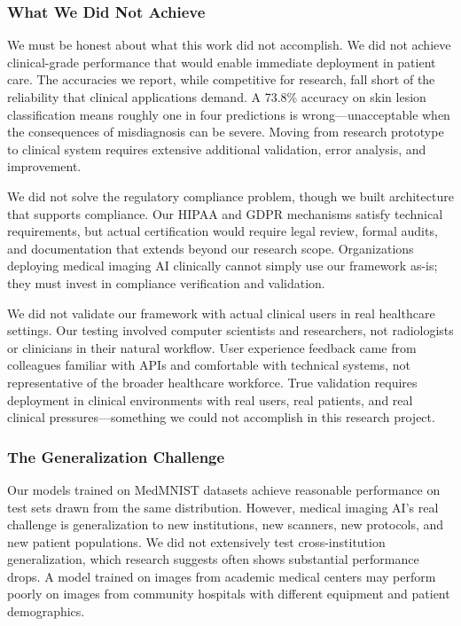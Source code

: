 \documentclass[12pt,a4paper]{article}
\begin{document}
\subsubsection{What We Did Not Achieve}

We must be honest about what this work did not accomplish. We did not achieve clinical-grade performance that would enable immediate deployment in patient care. The accuracies we report, while competitive for research, fall short of the reliability that clinical applications demand. A 73.8\% accuracy on skin lesion classification means roughly one in four predictions is wrong—unacceptable when the consequences of misdiagnosis can be severe. Moving from research prototype to clinical system requires extensive additional validation, error analysis, and improvement.

We did not solve the regulatory compliance problem, though we built architecture that supports compliance. Our HIPAA and GDPR mechanisms satisfy technical requirements, but actual certification would require legal review, formal audits, and documentation that extends beyond our research scope. Organizations deploying medical imaging AI clinically cannot simply use our framework as-is; they must invest in compliance verification and validation.

We did not validate our framework with actual clinical users in real healthcare settings. Our testing involved computer scientists and researchers, not radiologists or clinicians in their natural workflow. User experience feedback came from colleagues familiar with APIs and comfortable with technical systems, not representative of the broader healthcare workforce. True validation requires deployment in clinical environments with real users, real patients, and real clinical pressures—something we could not accomplish in this research project.

\subsubsection{The Generalization Challenge}

Our models trained on MedMNIST datasets achieve reasonable performance on test sets drawn from the same distribution. However, medical imaging AI's real challenge is generalization to new institutions, new scanners, new protocols, and new patient populations. We did not extensively test cross-institution generalization, which research suggests often shows substantial performance drops. A model trained on images from academic medical centers may perform poorly on images from community hospitals with different equipment and patient demographics.
\end{document}
